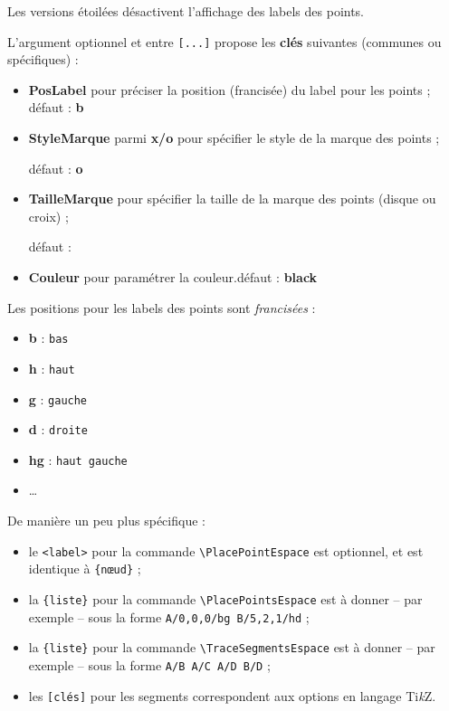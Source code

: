 \documentclass[french,a4paper,11pt]{article}
\providecommand\tikzlogo{Ti\textit{k}Z}
\let\TikZ\tikzlogo
\newcommand\Cle[1]{{\bfseries\sffamily\textlangle #1\textrangle}}
\begin{document}
\begin{tipblock}
Les versions étoilées désactivent l'affichage des labels des points.

\smallskip

L'argument optionnel et entre \texttt{[...]} propose les \Cle{clés} suivantes (communes ou spécifiques) :

\begin{itemize}
	\item \Cle{PosLabel} pour préciser la position (francisée) du label pour les points ; \hfill{}défaut : \Cle{b}
	\item \Cle{StyleMarque} parmi \Cle{x/o} pour spécifier le style de la marque des points ;
	
	\hfill{}défaut : \Cle{o}
	\item \Cle{TailleMarque} pour spécifier la taille de la marque des points (disque ou croix) ;
	
	\hfill{}défaut : \Cle{2pt}
	\item \Cle{Couleur} pour paramétrer la couleur.\hfill{}défaut : \Cle{black}
\end{itemize}
\vspace*{-\baselineskip}\leavevmode
\end{tipblock}

\begin{tipblock}
Les positions pour les labels des points sont \textit{francisées} :

\begin{itemize}
	\item \Cle{b} : \texttt{bas}
	\item \Cle{h} : \texttt{haut}
	\item \Cle{g} : \texttt{gauche}
	\item \Cle{d} : \texttt{droite}
	\item \Cle{hg} : \texttt{haut gauche}
	\item \ldots
\end{itemize}
\vspace*{-\baselineskip}\leavevmode
\end{tipblock}

\begin{tipblock}
De manière un peu plus spécifique :

\begin{itemize}
	\item le \texttt{<label>} pour la commande \texttt{\textbackslash PlacePointEspace} est optionnel, et est identique à \texttt{\{nœud\}} ;
	\item la \texttt{\{liste\}} pour la commande \texttt{\textbackslash PlacePointsEspace} est à donner -- par exemple -- sous la forme \texttt{A/0,0,0/bg B/5,2,1/hd} ;
	\item la \texttt{\{liste\}} pour la commande \texttt{\textbackslash TraceSegmentsEspace} est à donner -- par exemple -- sous la forme \texttt{A/B A/C A/D B/D} ;
	\item les \texttt{[clés]} pour les segments correspondent aux options en langage \TikZ.
\end{itemize}
\vspace*{-\baselineskip}\leavevmode
\end{tipblock}
\end{document}
